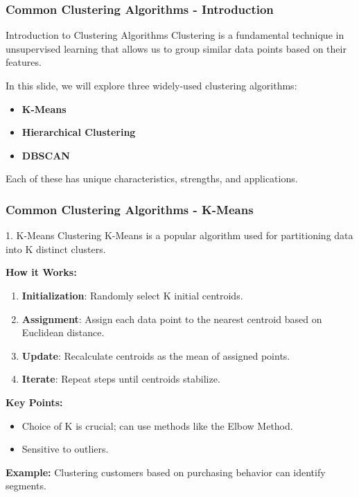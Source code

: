 \documentclass[aspectratio=169]{beamer}
\begin{document}
\begin{frame}[fragile]
    \frametitle{Common Clustering Algorithms - Introduction}
    \begin{block}{Introduction to Clustering Algorithms}
        Clustering is a fundamental technique in unsupervised learning that allows us to group similar data points based on their features.
    \end{block}
    In this slide, we will explore three widely-used clustering algorithms:
    \begin{itemize}
        \item \textbf{K-Means}
        \item \textbf{Hierarchical Clustering}
        \item \textbf{DBSCAN}
    \end{itemize}
    Each of these has unique characteristics, strengths, and applications.
\end{frame}

\begin{frame}[fragile]
    \frametitle{Common Clustering Algorithms - K-Means}
    \begin{block}{1. K-Means Clustering}
        K-Means is a popular algorithm used for partitioning data into K distinct clusters.
    \end{block}
    
    \textbf{How it Works:}
    \begin{enumerate}
        \item \textbf{Initialization}: Randomly select K initial centroids.
        \item \textbf{Assignment}: Assign each data point to the nearest centroid based on Euclidean distance.
        \item \textbf{Update}: Recalculate centroids as the mean of assigned points.
        \item \textbf{Iterate}: Repeat steps until centroids stabilize.
    \end{enumerate}
    
    \textbf{Key Points:}
    \begin{itemize}
        \item Choice of K is crucial; can use methods like the Elbow Method.
        \item Sensitive to outliers.
    \end{itemize}
    
    \textbf{Example:} Clustering customers based on purchasing behavior can identify segments.
\end{frame}
\end{document}
